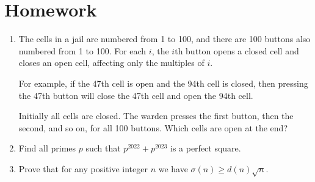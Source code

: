 \documentclass{article}
\begin{document}
\section{Homework}
\begin{enumerate}
  \item The cells in a jail are numbered from 1 to 100, and there are 100
    buttons also numbered from 1 to 100. For each $i$, the $i$th button opens a
    closed cell and closes an open cell, affecting only the multiples of $i$. 

    For example, if the 47th cell is open and the 94th cell is closed, then
    pressing the 47th button will close the 47th cell and open the 94th cell.

    Initially all cells are closed.
    The warden presses the first button, then the second, and so on, for all
    100 buttons. Which cells are open at the end?
  \item Find all primes $p$ such that $p^{2022}+p^{2023}$ is a perfect square.
  \item Prove that for any positive integer $n$ we have $\sigma(n)\ge d(n)\sqrt
    n$.
\end{enumerate}
\end{document}
